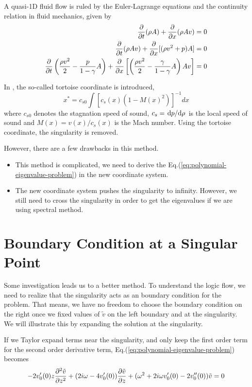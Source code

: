 A quasi-1D fluid flow is ruled by the Euler-Lagrange equations and the continuity relation in fluid mechanics, given by
\begin{align} \label{eq:euler-lagrange}
  \pdv{t}(\rho A) + \pdv{x}(\rho A v) &= 0 \\
  \pdv{t}(\rho A v) + \pdv{x}[(\rho v^2 + p)A] &= 0 \\
  \pdv{t}\left(\frac{\rho v^2}{2} - \frac{p}{1-\gamma}A\right) +
  \pdv{x}\left[ \left(\frac{\rho v^2}{2} - \frac{\gamma}{1-\gamma}A\right)Av \right] &= 0
\end{align}

In \cite{da_rocha_black_2017, furuhashi_simulation_2006}, the so-called tortoise coordinate is introduced,
\[ x^* = c_{s0}\int [c_s(x)(1-M(x)^2)]^{-1} dx \]
where $c_{s0}$ denotes the stagnation speed of sound, $c_s = \dv*{p}{\rho}$ is the local speed of sound and $M(x)= v(x)/c_s(x)$ is the Mach number. Using the tortoise coordinate, the singularity is removed.

However, there are a few drawbacks in this method.
\begin{itemize}
  \item This method is complicated, we need to derive the Eq.(\ref{eq:polynomial-eigenvalue-problem}) in the new coordinate system.
  \item The new coordinate system pushes the singularity to infinity. However, we still need to cross the singularity in order to get the eigenvalues if we are using spectral method. 
\end{itemize}


\section{Boundary Condition at a Singular Point}
Some investigation leads us to a better method. To understand the logic flow, we need to realize that the singularity acts as an boundary condition for the problem. That means, we have no freedom to choose the boundary condition on the right once we fixed values of $\tilde{v}$ on the left boundary and at the singularity. We will illustrate this by expanding the solution at the singularity.

If we Taylor expand terms near the singularity, and only keep the first order term for the second order derivative term, Eq.(\ref{eq:polynomial-eigenvalue-problem}) becomes
\[ - 2v_0'(0)z\pdv[2]{\tilde{v}}{z}
+ (2i\omega - 4v_0'(0))\pdv{\tilde{v}}{z} 
+ (\omega^2 + 2i\omega v_0'(0) - 2v_0''(0))\tilde{v}
= 0 \]

